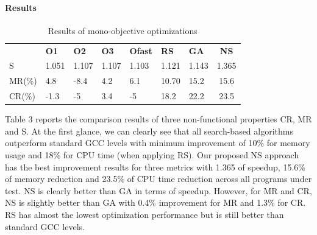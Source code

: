 





\paragraph{Results}


\vspace{-1.2em}
\begin{table}[h]
	\centering
	\caption{Results of mono-objective optimizations}
	\label{my-label}
	\begin{tabular}{|l|l|l|l|l|l|l|c|}
		\hline
		& \textbf{O1}                    & \textbf{O2}                    & \textbf{O3}                    & \textbf{Ofast}                 & \textbf{RS}                    & \textbf{GA}                    & 
		\textbf{NS} \\
		\hhline{|=|=|=|=|=|=|=|=|}
		S  &  1.051 & 1.107  & 1.107  & 1.103  & 1.121  &  1.143 &  1.365  \\ \hline
		MR(\%) & 4.8  & -8.4  &  4.2 & 6.1  &  10.70 & 15.2  &  15.6  \\ \hline
		CR(\%) & -1.3  & -5  & 3.4  & -5  &  18.2 & 22.2  &  23.5  \\ \hline
	\end{tabular}
\end{table}
Table 3 reports the comparison results of three non-functional properties CR, MR and S. At the first glance, we can clearly see that all search-based algorithms outperform standard GCC levels with minimum improvement of 10\% for memory usage and 18\% for CPU time (when applying RS). 
Our proposed NS approach has the best improvement results for three metrics with 1.365 of speedup, 15.6\% of memory reduction and 23.5\% of CPU time reduction across all programs under test. NS is clearly better than GA in terms of speedup. However, for MR and CR, NS is slightly better than GA with 0.4\% improvement for MR and 1.3\% for CR. RS has almost the lowest optimization performance but is still better than standard GCC levels.

